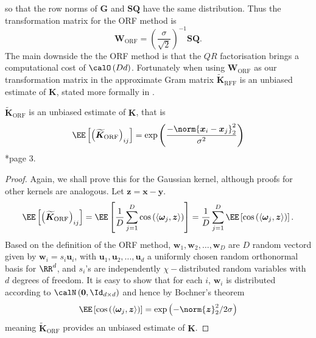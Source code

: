 so that the row norms of $\bm{G}$ and $\bm{S} \bm{Q}$ have the same distribution. Thus the transformation matrix for the ORF method is
\begin{equation}
    \bm{W}_{\text{ORF}} = \left( \frac{\sigma}{\sqrt{2}} \right)^{-1} \bm{S} \bm{Q}.
\end{equation}
The main downside the the ORF method is that the $QR$ factorisation brings a computational cost of $\calO \left( Dd \right)$. Fortunately when using $\bm{W}_{\text{ORF}}$ as our transformation matrix in  the approximate Gram matrix $\bm{\widetilde{K}}_{\text{RFF}}$ is an unbiased estimate of $\bm{K}$, stated more formally in .

\begin{thm} \label{thm: orf-unbiased}
    $\bm{\widetilde{K}}_{\text{ORF}}$ is an unbiased estimate of $\bm{K}$, that is
    \[
        \EE \left[ \left( \bm{\widetilde{K}}_{\text{ORF}} \right)_{ij} \right] = \exp \left( \frac{- \norm{\bm{x}_i - {\bm{x}_j}}_{2}^{2}}{\sigma^2} \right)
    \] \cite{YuFelixX2016ORF}*{page 3}.
\end{thm}
\begin{proof}
    Again, we shall prove this for the Gaussian kernel, although proofs for other kernels are analogous. Let $\bm{z} = \bm{x} - \bm{y}$.
    \begin{equation*}
        \EE \left[ \left( \bm{\widetilde{K}}_{\text{ORF}} \right)_{ij} \right] = \EE \left[ \frac{1}{D} \sum_{j=1}^{D} \cos \left( \langle \bm{\omega}_j , \bm{z} \rangle \right) \right] = \frac{1}{D} \sum_{j=1}^{D} \EE \left[ \cos \left( \langle \bm{\omega}_j , \bm{z} \rangle \right) \right].
    \end{equation*}
    Based on the definition of the ORF method, $\bm{w}_1 , \bm{w}_2 , \ldots , \bm{w}_D$ are $D$ random vectord given by $\bm{w}_i = s_i \bm{u}_i$, with $\bm{u}_1 , \bm{u}_2 , \ldots , \bm{u}_d$ a uniformly chosen random orthonormal basis for $\RR^d$, and $s_i$'s are independently $\chi-$distributed random variables with $d$ degrees of freedom. It is easy to show that for each $i$, $\bm{w}_i$ is distributed according to $\calN \left( \bm{0}, \Id_{d \times d} \right)$ and hence by Bochner's theorem
    \[
        \EE \left[ \cos \left( \langle \bm{\omega}_j , \bm{z} \rangle \right) \right] = \exp \left( - \norm{\bm{z}}^2_2 / 2 \sigma \right)
    \]
    meaning $\bm{\widetilde{K}}_{\text{ORF}}$ provides an unbiased estimate of $\bm{K}$.
\end{proof}

